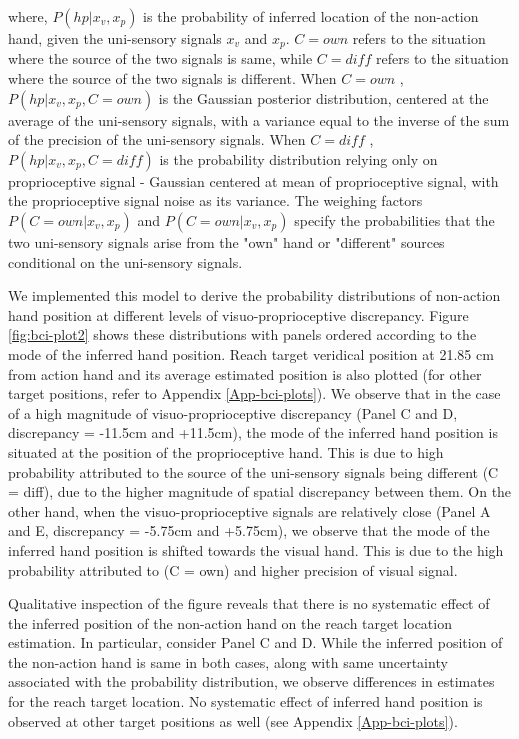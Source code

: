 where, $P(hp | x_v, x_p) $ is the probability of inferred location of the non-action hand, given the uni-sensory signals $x_v$ and $x_p$. $C=own$ refers to the situation where the source of the two signals is same, while $C=diff$ refers to the situation where the source of the two signals is different.  When $C=own$ , $P(hp | x_v, x_p, C = own)$ is the Gaussian posterior distribution, centered at the average of the uni-sensory signals, with a variance equal to the inverse of the sum of the precision of the uni-sensory signals. When $C=diff$ , $P(hp | x_v, x_p, C = diff)$ is the probability distribution relying only on proprioceptive signal - Gaussian centered at mean of proprioceptive signal, with the proprioceptive signal noise as its variance. The weighing factors $P(C = own | x_v,x_p )$ and $P(C = own | x_v,x_p )$ specify the probabilities that the two uni-sensory signals arise from the "own" hand or "different" sources conditional on the uni-sensory signals. 



We implemented this model to derive the probability distributions of non-action hand position at different levels of visuo-proprioceptive discrepancy. Figure \ref{fig:bci-plot2} shows these distributions with panels ordered according to the mode of the inferred hand position. Reach target veridical position at 21.85 cm from action hand and its average estimated position is also plotted (for other target positions, refer to Appendix \ref{App-bci-plots}). We observe that in the case of a high magnitude of visuo-proprioceptive discrepancy (Panel C and D, discrepancy = -11.5cm and +11.5cm), the mode of the inferred hand position is situated at the position of the proprioceptive hand. This is due to high probability attributed to the source of the uni-sensory signals being different (C = diff), due to the higher magnitude of spatial discrepancy between them. On the other hand, when the visuo-proprioceptive signals are relatively close (Panel A and E, discrepancy = -5.75cm and +5.75cm), we observe that the mode of the inferred hand position is shifted towards the visual hand. This is due to the high probability attributed to (C = own) and higher precision of visual signal. 

Qualitative inspection of the figure reveals that there is no systematic effect of the inferred position of the non-action hand on the reach target location estimation. In particular, consider Panel C and D. While the inferred position of the non-action hand is same in both cases, along with same uncertainty associated with the probability distribution, we observe differences in estimates for the reach target location. No systematic effect of inferred hand position is observed at other target positions as well (see Appendix \ref{App-bci-plots}). 

